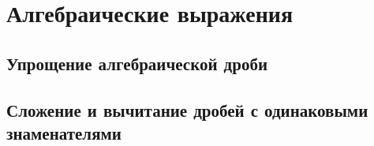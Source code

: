 \chapter{Алгебраические выражения}
\section{Упрощение алгебраической дроби}
\section{Сложение и вычитание дробей с одинаковыми знаменателями}
